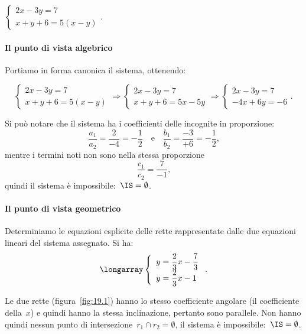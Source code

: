  \begin{exrig}
 \begin{esempio}
$\left\{\begin{array}{l}2x-3y=7 \\x+y+6=5(x-y)\end{array}\right..$

\paragraph{Il punto di vista algebrico}
Portiamo in forma canonica il sistema, ottenendo:

\begin{equation*}
\left\{\begin{array}{l}2x-3y=7 \\x+y+6=5(x-y)\end{array}\right.\Rightarrow
\left\{\begin{array}{l}2x-3y=7 \\x+y+6=5x-5y\end{array}\right.\Rightarrow
\left\{\begin{array}{l}2x-3y=7 \\-4x+6y=-6\end{array}\right..
\end{equation*}

Si può notare che il sistema ha i coefficienti delle incognite in
proporzione:
\[\frac{a_{1}}{a_{2}}=\frac{2}{-4}=-{\frac{1}{2}}\quad\text{e}\quad\frac{b_{1}}{b_{2}}=\frac{-3}{+6}=-{\frac{1}{2}}\text{,}\]
mentre i termini noti non sono nella stessa proporzione
\[\frac{c_{1}}{c_{2}}=\frac{7}{-1}\text{,}\]
quindi il sistema è impossibile:~$\IS=\emptyset $.

\paragraph{Il punto di vista geometrico}

Determiniamo le equazioni esplicite delle rette rappresentate dalle due
equazioni lineari del sistema assegnato. Si ha:
\[\longarray\left\{\begin{array}{l}y=\dfrac{2}{3}x-\dfrac{7}{3}\\y=\dfrac{2}{3}x-1\end{array}\right..\]

Le due rette (figura~\ref{fig:19.1}) hanno lo stesso coefficiente angolare (il coefficiente
della~$x$) e quindi hanno la stessa inclinazione, pertanto sono parallele.
Non hanno quindi nessun punto di intersezione~$r_{1}\cap r_{2}=\emptyset $, il sistema è impossibile:~$\IS=\emptyset $.
 \end{esempio}


\end{exrig}
